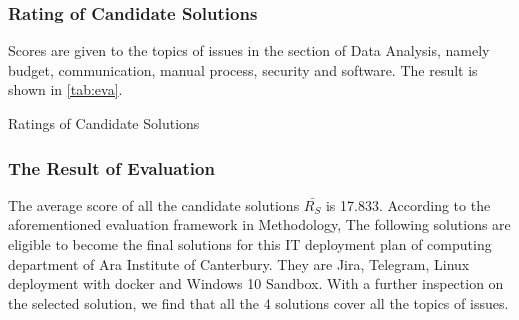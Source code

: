 \subsubsection{Rating of Candidate Solutions}

Scores are given to the topics of issues in the section of Data Analysis, namely budget, communication, manual process, security and software. The result is shown in \autoref{tab:eva}.

\begin{table}[!ht]
\caption{Ratings of Candidate Solutions}
\begin{adjustbox}{width=1\textwidth}
\end{adjustbox}
\label{tab:eva}
\end{table}

\subsubsection{The Result of Evaluation}
The average score of all the candidate solutions $\bar{R_{S}}$ is 17.833. According to the aforementioned evaluation framework in Methodology, The following solutions are eligible to become the final solutions for this IT deployment plan of computing department of Ara Institute of Canterbury. They are Jira, Telegram, Linux deployment with docker and Windows 10 Sandbox. With a further inspection on the selected solution, we find that all the 4 solutions cover all the topics of issues.





